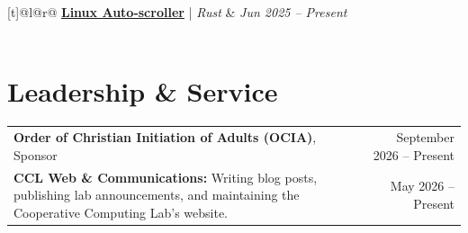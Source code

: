 \documentclass[letterpaper,11pt]{article}
\begin{document}
\begin{tabular*}{\textwidth}[t]{@{}l@{\extracolsep{\fill}}r@{}}
    \textbf{\href{https://github.com/RHartung-ND/Auto-Scroll-Linux}{Linux Auto-scroller}} | \textit{Rust} & \textit{Jun 2025 -- Present}\\
    \vspace{-10pt}\\
  \end{tabular*}


\section{Leadership \& Service}
  \begin{small}
    \begin{tabularx}{\textwidth}{@{} X r @{}}
      \textbf{Order of Christian Initiation of Adults (OCIA)}, Sponsor & September 2026 -- Present \\
      \textbf{CCL Web \& Communications:} Writing blog posts, publishing lab announcements, and maintaining the Cooperative Computing Lab's website. & May 2026 -- Present \\
    \end{tabularx}
  \end{small}
\end{document}
